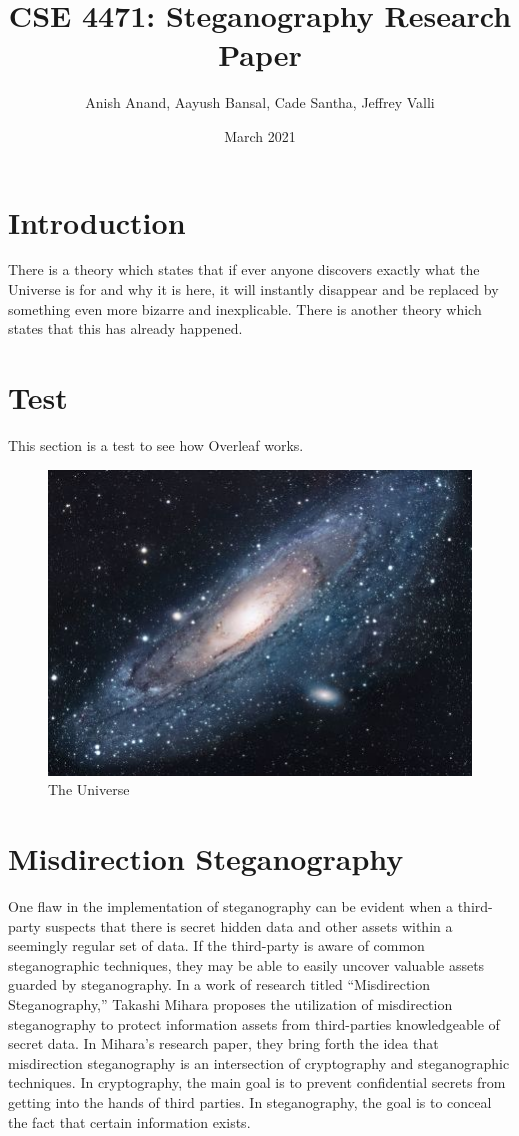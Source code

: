 \documentclass{article}
\title{CSE 4471: Steganography Research Paper}
\author{Anish Anand, Aayush Bansal, Cade Santha, Jeffrey Valli}
\date{March 2021}
\begin{document}
\maketitle

\section{Introduction}
There is a theory which states that if ever anyone discovers exactly what the Universe is for and why it is here, it will instantly disappear and be replaced by something even more bizarre and inexplicable.
There is another theory which states that this has already happened.

\section{Test}
This section is a test to see how Overleaf works.

\begin{figure}[h!]
\centering
\includegraphics[scale=1.7]{universe}
\caption{The Universe}
\label{fig:universe}
\end{figure}

\section{Misdirection Steganography}
One flaw in the implementation of steganography can be evident when a third-party suspects that there is secret hidden data and other assets within a seemingly regular set of data. If the third-party is aware of common steganographic techniques, they may be able to easily uncover valuable assets guarded by steganography. In a work of research titled “Misdirection Steganography,” Takashi Mihara proposes the utilization of misdirection steganography to protect information assets from third-parties knowledgeable of secret data. In Mihara’s research paper, they bring forth the idea that misdirection steganography is an intersection of cryptography and steganographic techniques. In cryptography, the main goal is to prevent confidential secrets from getting into the hands of third parties. In steganography, the goal is to conceal the fact that certain information exists. 
\end{document}
